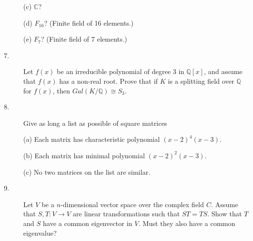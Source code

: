 \documentclass{article}
\def\C{\mathbb C}
\def\Q{\mathbb Q}
\begin{document}
\begin{description}
\item[\quad] (c)
$\C$?

\item[\quad] (d)
$F_{16}$? (Finite field of 16 elements.)

\item[\quad] (e)
$F_7$? (Finite field of 7 elements.)

\item[7.]
Let $f(x)$ be an irreducible polynomial of degree 3 in $\Q[x]$, and assume
that $f(x)$ has a non-real root. Prove that if $K$ is a splitting
field over $\Q$ for $f(x)$, then $Gal(K/\Q) \cong S_3$.

\item[8.]
Give as long a list as possible of square matrices

\item[\quad] (a)
Each matrix has characteristic polynomial $(x-2)^4(x-3)$.

\item[\quad] (b)
Each matrix has minimal polynomial $(x-2)^2(x-3)$.

\item[\quad] (c)
No two matrices on the list are similar.

\item[9.]
Let $V$ be a $n$-dimensional vector space over the complex field $C$.
Assume that $S,T : V \to V$ are linear transformations such that
$ST = TS$. Show that $T$ and $S$ have a common eigenvector in $V$. Must
they also have a common eigenvalue?





\end{description}    
\end{document}
